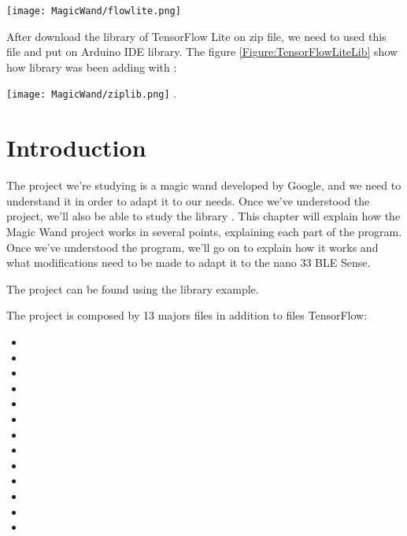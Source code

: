 \begin{center}
    \texttt{[image: MagicWand/flowlite.png]}
    \label{Figure:TensorFlowLite}
\end{center}

After download the library of TensorFlow Lite on zip file, we need to used this file and put on Arduino IDE library. The figure \ref{Figure:TensorFlowLiteLib} show how library was been adding with : 


\begin{center}
    \texttt{[image: MagicWand/ziplib.png]}
    . \label{Figure:TensorFlowLiteLib}	
\end{center}


\section{Introduction}

The project we're studying is a magic wand developed by Google, and we need to understand it in order to adapt it to our needs. Once we've understood the project, we'll also be able to study the library . This chapter will explain how the Magic Wand project works in several points, explaining each part of the program. Once we've understood the program, we'll go on to explain how it works and what modifications need to be made to adapt it to the nano 33 BLE Sense.

\bigskip 

The project can be found using the library  example. 

The project is composed by 13 majors files in addition to files TensorFlow: 

\begin{itemize}
    \item {}
    \item {}
    \item {}
    \item {}
    \item {}
    \item {}
    \item {}
    \item {}
    \item {}
    \item {}
    \item {}
    \item {}
    \item {}
    
\end{itemize}

